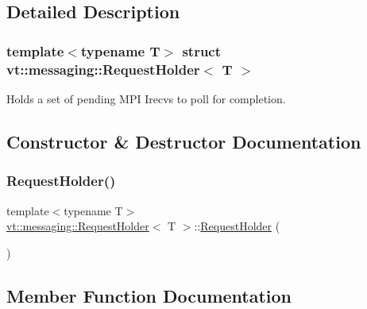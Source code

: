 \subsection{Detailed Description}
\subsubsection*{template$<$typename T$>$\newline
struct vt\+::messaging\+::\+Request\+Holder$<$ T $>$}

Holds a set of pending M\+PI Irecvs to poll for completion. 

\subsection{Constructor \& Destructor Documentation}
\mbox{\label{structvt_1_1messaging_1_1_request_holder_abf7510642c71a18bf6b5425e385546f2}} 
\subsubsection{\texorpdfstring{Request\+Holder()}{RequestHolder()}}
{\footnotesize\ttfamily template$<$typename T$>$ \\
\hyperlink{structvt_1_1messaging_1_1_request_holder}{vt\+::messaging\+::\+Request\+Holder}$<$ T $>$\+::\hyperlink{structvt_1_1messaging_1_1_request_holder}{Request\+Holder} (\begin{DoxyParamCaption}{ }\end{DoxyParamCaption})\hspace{0.3cm}{\ttfamily [default]}}



\subsection{Member Function Documentation}
\mbox{\label{structvt_1_1messaging_1_1_request_holder_ae08498f2b80a7fdb486134a670d19307}} 
